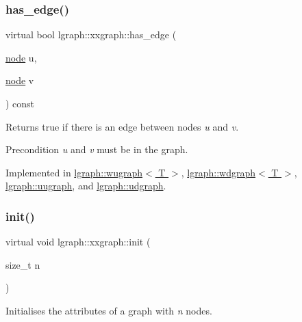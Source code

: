 \subsubsection{\texorpdfstring{has\+\_\+edge()}{has\_edge()}}
{\footnotesize\ttfamily virtual bool lgraph\+::xxgraph\+::has\+\_\+edge (\begin{DoxyParamCaption}\item[{\hyperlink{namespacelgraph_a397169dd66adf725210a30fb7251773e}{node}}]{u,  }\item[{\hyperlink{namespacelgraph_a397169dd66adf725210a30fb7251773e}{node}}]{v }\end{DoxyParamCaption}) const\hspace{0.3cm}{\ttfamily [pure virtual]}}



Returns true if there is an edge between nodes {\itshape u} and {\itshape v}. 

\begin{DoxyPrecond}{Precondition}
{\itshape u} and {\itshape v} must be in the graph. 
\end{DoxyPrecond}


Implemented in \hyperlink{classlgraph_1_1wugraph_a203b19538ef6662a793999973801be93}{lgraph\+::wugraph$<$ T $>$}, \hyperlink{classlgraph_1_1wdgraph_a0b0f9b2cec5dbdd7eb84305c588e31c1}{lgraph\+::wdgraph$<$ T $>$}, \hyperlink{classlgraph_1_1uugraph_a36bc44714a043830eff62b5aebe5a9c3}{lgraph\+::uugraph}, and \hyperlink{classlgraph_1_1udgraph_a31370a81898abdc230ad2a3b0d274187}{lgraph\+::udgraph}.

\mbox{\label{classlgraph_1_1xxgraph_aba97900b2d33e1bb0d31594cf169f0ba}} 
\subsubsection{\texorpdfstring{init()}{init()}}
{\footnotesize\ttfamily virtual void lgraph\+::xxgraph\+::init (\begin{DoxyParamCaption}\item[{size\+\_\+t}]{n }\end{DoxyParamCaption})\hspace{0.3cm}{\ttfamily [pure virtual]}}



Initialises the attributes of a graph with {\itshape n} nodes. 

